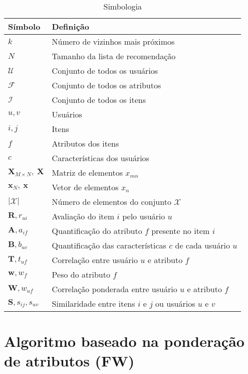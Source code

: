 \begin{table}[hp]
\begin{center}
    \caption{Simbologia}
    \label{tab:simbologia}
    \begin{tabular}{ | l | l | }
    \hline
    \textbf{Símbolo} & \textbf{Definição} \\ \hline
    $k$ & Número de vizinhos mais próximos \\ \hline
    $N$ & Tamanho da lista de recomendação \\ \hline
    $\mathcal{U}$ & Conjunto de todos os usuários \\ \hline
    $\mathcal{F}$ & Conjunto  de todos os atributos \\ \hline
    $\mathcal{I}$ & Conjunto de todos os itens \\ \hline
    $u, v$ & Usuários \\ \hline
    $i, j$ & Itens \\ \hline
    $f$ & Atributos dos itens \\ \hline
    $c $ & Características dos usuários \\ \hline
    $\mathbf{X}_{M \times N},~\mathbf{X}$ & Matriz de elementos $x_{mn}$ \\ \hline
    $\mathbf{x}_{N},~\mathbf{x}$ & Vetor de elementos $x_{n}$ \\ \hline
    $|\mathcal{X}|$ & Número de elementos do conjunto $\mathcal{X}$ \\ \hline
    $\mathbf{R}, r_{ui}$ & Avaliação do item $i$ pelo usuário $u$\\ \hline
    $\mathbf{A}, a_{if}$ & Quantificação do atributo $f$ presente no item $i$ \\ \hline
    $\mathbf{B}, b_{uc}$ & Quantificação das características $c$ de cada usuário $u$ \\ \hline    
    $\mathbf{T}, t_{uf}$ & Correlação entre usuário $u$ e atributo $f$ \\ \hline
    $\mathbf{w}, w_{f}$ & Peso do atributo $f$ \\ \hline
    $\mathbf{W}, w_{uf}$ & Correlação ponderada entre usuário $u$ e atributo $f$ \\ \hline
    $\mathbf{S}, s_{ij}, s_{uv}$ & Similaridade entre itens $i$ e $j$ ou usuários $u$ e $v$\\ \hline
    \end{tabular}
\end{center}
\end{table}


\section{Algoritmo baseado na ponderação de atributos (FW)} %
\label{sec:algoritmo_baseado_na_pondera_o_de_atributos_}

